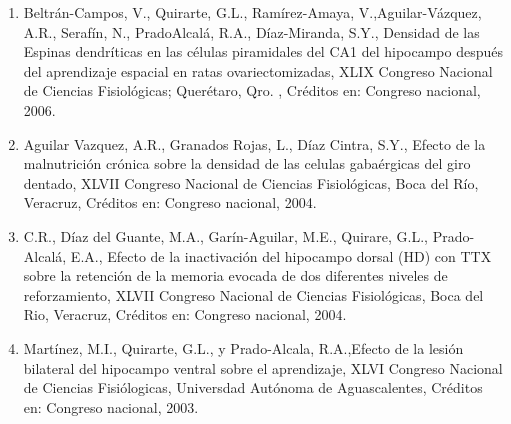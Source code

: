 \begin{enumerate}
\item Beltrán-Campos, V., Quirarte, G.L., Ramírez-Amaya, V.,Aguilar-Vázquez, A.R., Serafín, N., PradoAlcalá, R.A., 
Díaz-Miranda, S.Y., Densidad de las Espinas dendríticas en las células piramidales del CA1 del hipocampo después del 
aprendizaje espacial en ratas ovariectomizadas, XLIX Congreso Nacional de Ciencias Fisiológicas; Querétaro, Qro. , Créditos 
en: Congreso nacional, 2006.

\item Aguilar Vazquez, A.R., Granados Rojas, L., Díaz Cintra, S.Y., Efecto de la malnutrición crónica sobre la densidad de las 
celulas gabaérgicas del giro dentado, XLVII Congreso Nacional de Ciencias Fisiológicas, Boca del Río, Veracruz, Créditos 
en: Congreso nacional, 2004.

\item C.R., Díaz del Guante, M.A., Garín-Aguilar, M.E., Quirare, G.L., Prado-Alcalá, E.A., Efecto de la inactivación del 
hipocampo dorsal (HD) con TTX sobre la retención de la memoria evocada de dos diferentes niveles de reforzamiento, XLVII 
Congreso Nacional de Ciencias Fisiológicas, Boca del Rio, Veracruz, Créditos en: Congreso nacional, 2004.

\item Martínez, M.I., Quirarte, G.L., y Prado-Alcala, R.A.,Efecto de la lesión bilateral del hipocampo ventral sobre el 
aprendizaje, XLVI Congreso Nacional de Ciencias Fisiólogicas, Universdad Autónoma de Aguascalentes, Créditos en: Congreso 
nacional, 2003.

\end{enumerate}
